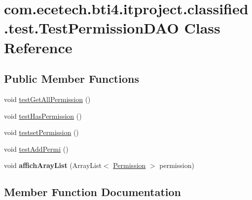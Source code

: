 \hypertarget{classcom_1_1ecetech_1_1bti4_1_1itproject_1_1classified_1_1test_1_1_test_permission_d_a_o}{}\section{com.\+ecetech.\+bti4.\+itproject.\+classified.\+test.\+Test\+Permission\+D\+AO Class Reference}
\label{classcom_1_1ecetech_1_1bti4_1_1itproject_1_1classified_1_1test_1_1_test_permission_d_a_o}
\subsection*{Public Member Functions}
\begin{DoxyCompactItemize}
\item 
void \hyperlink{classcom_1_1ecetech_1_1bti4_1_1itproject_1_1classified_1_1test_1_1_test_permission_d_a_o_a16bd99aafae0c6a435d173a357689e38}{test\+Get\+All\+Permission} ()
\item 
void \hyperlink{classcom_1_1ecetech_1_1bti4_1_1itproject_1_1classified_1_1test_1_1_test_permission_d_a_o_a32d21ef8eb20a721573e82e0838384dc}{test\+Has\+Permission} ()
\item 
void \hyperlink{classcom_1_1ecetech_1_1bti4_1_1itproject_1_1classified_1_1test_1_1_test_permission_d_a_o_a4589b2226bb846aee06beea085808b2e}{testset\+Permission} ()
\item 
void \hyperlink{classcom_1_1ecetech_1_1bti4_1_1itproject_1_1classified_1_1test_1_1_test_permission_d_a_o_acf5b38a15547d9c632015060ad8ca937}{test\+Add\+Permi} ()
\item 
void {\bfseries affich\+Aray\+List} (Array\+List$<$ \hyperlink{classcom_1_1ecetech_1_1bti4_1_1itproject_1_1classified_1_1beans_1_1_permission}{Permission} $>$ permission)\hypertarget{classcom_1_1ecetech_1_1bti4_1_1itproject_1_1classified_1_1test_1_1_test_permission_d_a_o_a107d4746be83c388ea3dc7c2e0d7f9e7}{}\label{classcom_1_1ecetech_1_1bti4_1_1itproject_1_1classified_1_1test_1_1_test_permission_d_a_o_a107d4746be83c388ea3dc7c2e0d7f9e7}

\end{DoxyCompactItemize}


\subsection{Member Function Documentation}
